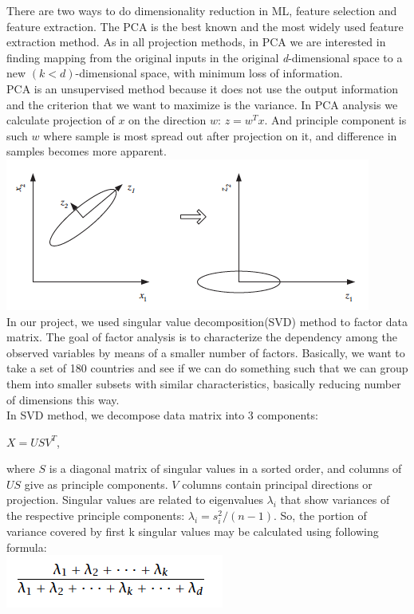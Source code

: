 \documentclass[12pt, letterpaper]{article}
\begin{document}
\begin{enumerate}[label=\Roman*.]
	There are two ways to do dimensionality reduction in ML, feature selection and feature extraction. The PCA is the best known and the most widely used  feature extraction method.  As in all projection methods, in PCA we are interested in finding mapping from the original inputs in the original {\it d}-dimensional space to a new \((k < d)\)-dimensional space, with minimum loss of information. \\ 
	PCA  is an unsupervised method because it does not use the output information and  the criterion that we want to maximize is the variance. In PCA analysis we calculate projection of \(x\) on the direction \(w\): \(z=w^Tx\). And principle component is such \(w\)  where sample is most spread out after projection on it, and difference in samples becomes more apparent.\\
	\includegraphics[scale=0.9]{1.png} \\
	In our project, we used singular value decomposition(SVD) method to factor data matrix. The goal of factor analysis is to characterize the dependency among the observed variables by means of a smaller number of factors. Basically, we want to take a set of 180 countries and see if we can do something such that we can group them into smaller subsets with similar characteristics, basically reducing number of dimensions this way. \\
	In SVD method, we decompose data matrix into 3 components:
	\begin{center} \(X = USV^T\), \end{center}
	where \(S\) is a diagonal matrix of singular values in a sorted order, and columns of \(US\) give as principle components. \(V\) columns contain principal directions or projection. Singular values are related to eigenvalues \( \lambda_i \) that show variances of the respective principle components: \( \lambda_i = s_i^2 / (n-1) \). So, the portion of variance covered by first k singular values may be calculated using following formula: \\
	 \includegraphics[scale=0.65]{4.png} \\

\end{enumerate}
\end{document}
